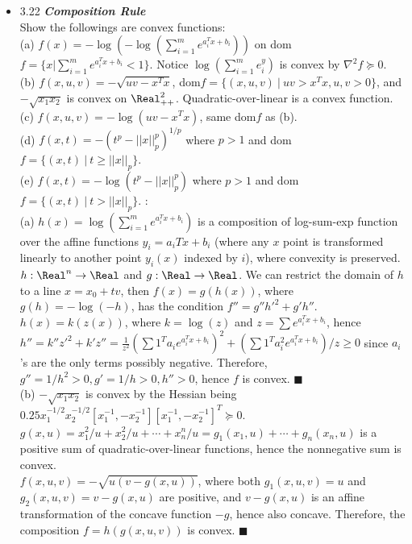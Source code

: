 \begin{itemize}
\item 3.22 {\bf\emph{Composition Rule}} \\ Show the followings are convex functions: \\ (a) $f(x) =
-\log(-\log(\sum_{i=1}^m e^{a_i^Tx+b_i}))$ on dom$f = \{ x | \sum_{i=1}^m e^{a_i^Tx+b_i} < 1 \}$.
Notice $\log(\sum_{i=1}^m e^y_i)$ is convex by $\nabla^2 f \succeq 0$.  \\ (b) $f(x,u,v) = -\sqrt{uv
- x^Tx}$, dom$f = \{ (x,u,v) \ | \ uv > x^Tx, u,v > 0 \}$, and $-\sqrt{x_1x_2}$ is convex on
  $\Real_{++}^2$. Quadratic-over-linear is a convex function. \\ (c) $f(x,u,v) = -\log(uv - x^Tx)$,
same dom$f$ as (b). \\ (d) $f(x,t) = -(t^p - ||x||_p^p)^{1/p}$ where $p > 1$ and dom$f = \{ (x, t) \
| \ t \ge ||x||_p \}$.  \\ (e) $f(x,t) = -\log(t^p − ||x||_p^p)$ where $p > 1$ and dom$f = \{ (x,t)
\ | \ t > ||x||_p \}$.  \Proof: \\ (a) $h(x) = \log(\sum_{i=1}^m e^{a_i^Tx+b_i})$ is a composition
of log-sum-exp function over the affine functions $y_i = a_iTx + b_i$ (where any $x$ point is
transformed linearly to another point $y_i(x)$ indexed by $i$), where convexity is preserved.
$h:\Real^n \rightarrow \Real$ and $g: \Real \rightarrow \Real$.  We can restrict the domain of $h$
to a line $x = x_0+tv$, then $f(x) = g(h(x))$, where $g(h) = -\log (-h)$, has the condition $ f'' =
g''h'^2 + g'h'' $.  $h(x) = k(z(x))$, where $k = \log(z)$ and $z = \sum e^{a_i^Tx + b_i}$, hence
$h'' = k'' z'^2 + k'z'' = \frac{1}{z^2}(\sum 1^Ta_ie^{a_i^Tx+b_i})^2 + (\sum 1^Ta_i^2
e^{a_i^Tx+b_i})/z \ge 0$ since $a_i$'s are the only terms possibly negative.  Therefore, $g'' =
1/h^2 > 0, g'=1/h>0, h''>0$, hence $f$ is convex. $\blacksquare$ \\   

   (b) $-\sqrt{x_1x_2}$ is convex by the Hessian being $0.25x_1^{-1/2}x_2^{-1/2}[x_1^{-1},
-x_2^{-1}][x_1^{-1}, -x_2^{-1}]^T \succeq 0$.  $g(x,u) = x_1^2/u + x_2^2/u + \cdots + x_n^n/u =
g_1(x_1,u) + \cdots + g_n(x_n,u)$ is a positive sum of quadratic-over-linear functions, hence the
nonnegative sum is convex. \\   $f(x,u,v) = -\sqrt{u(v-g(x,u))}$, where both $g_1(x,u,v) = u$ and
$g_2(x,u,v) = v-g(x,u)$ are positive, and $v-g(x,u)$ is an affine transformation of the concave
function $-g$, hence also concave.  Therefore, the composition $f = h(g(x,u,v))$ is convex.
$\blacksquare$ \\ 
   

\end{itemize}
